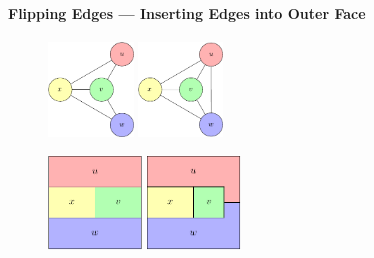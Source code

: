 \documentclass[t,18pt]{beamer}
\newcommand{\emdash}{---}
\begin{document}
\begin{frame}[c]
  \frametitle{}
  \framesubtitle{Flipping Edges \emdash{} Inserting Edges into Outer Face}
  \begin{figure}
    \includegraphics[height=2.5cm]{../Thesis/Resources/FlipEdge-Example-Insert-1.pdf}
    \qquad\quad
    \includegraphics[height=2.5cm]{../Thesis/Resources/FlipEdge-Example-Insert-2.pdf}
  \end{figure}
  \begin{figure}
    \includegraphics[height=2.5cm]{../Thesis/Resources/FlipEdge-Example-Insert-3.pdf}
    \qquad
    \includegraphics[height=2.5cm]{../Thesis/Resources/FlipEdge-Example-Insert-4.pdf}
  \end{figure}
\end{frame}
\end{document}
